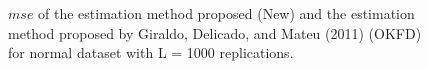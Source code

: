 \documentclass[12pt,]{article}
\theoremstyle{definition}
\theoremstyle{definition}
\theoremstyle{definition}
\theoremstyle{remark}
\begin{document}
\begin{figure}[htbp]
  \caption{$mse$ of the estimation method proposed (New) and the estimation method proposed by Giraldo, Delicado, and Mateu (2011) (OKFD) for normal dataset with L = 1000 replications.}
\end{figure}

\begin{figure}[htbp]

\end{figure}
\end{document}
